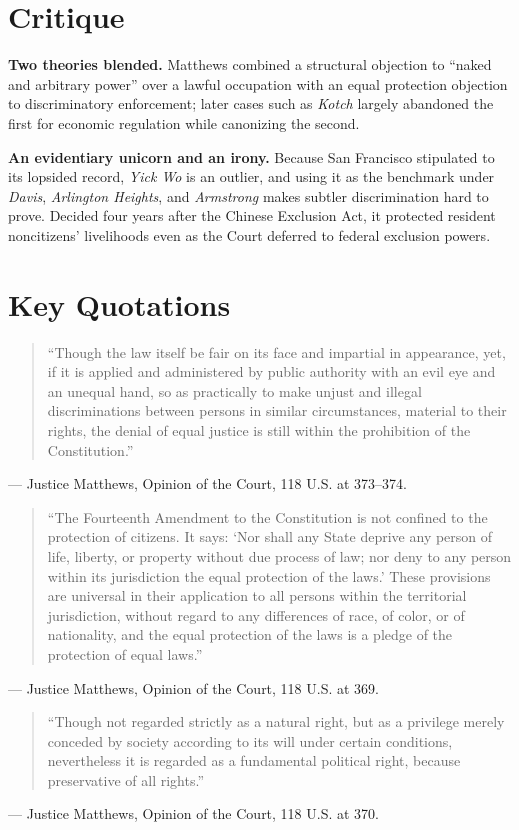 \documentclass[12pt]{article}
\begin{document}
\section{Critique}

\textbf{Two theories blended.} Matthews combined a structural objection to ``naked and arbitrary power'' over a lawful occupation with an equal protection objection to discriminatory enforcement; later cases such as \textit{Kotch} largely abandoned the first for economic regulation while canonizing the second.

\textbf{An evidentiary unicorn and an irony.} Because San Francisco stipulated to its lopsided record, \textit{Yick Wo} is an outlier, and using it as the benchmark under \textit{Davis}, \textit{Arlington Heights}, and \textit{Armstrong} makes subtler discrimination hard to prove. Decided four years after the Chinese Exclusion Act, it protected resident noncitizens' livelihoods even as the Court deferred to federal exclusion powers.

\section{Key Quotations}

\begin{quote}
``Though the law itself be fair on its face and impartial in appearance, yet, if it is applied and administered by public authority with an evil eye and an unequal hand, so as practically to make unjust and illegal discriminations between persons in similar circumstances, material to their rights, the denial of equal justice is still within the prohibition of the Constitution.''
\end{quote}
\noindent --- Justice Matthews, Opinion of the Court, 118 U.S. at 373--374.

\begin{quote}
``The Fourteenth Amendment to the Constitution is not confined to the protection of citizens. It says: `Nor shall any State deprive any person of life, liberty, or property without due process of law; nor deny to any person within its jurisdiction the equal protection of the laws.' These provisions are universal in their application to all persons within the territorial jurisdiction, without regard to any differences of race, of color, or of nationality, and the equal protection of the laws is a pledge of the protection of equal laws.''
\end{quote}
\noindent --- Justice Matthews, Opinion of the Court, 118 U.S. at 369.

\begin{quote}
``Though not regarded strictly as a natural right, but as a privilege merely conceded by society according to its will under certain conditions, nevertheless it is regarded as a fundamental political right, because preservative of all rights.''
\end{quote}
\noindent --- Justice Matthews, Opinion of the Court, 118 U.S. at 370.
\end{document}
